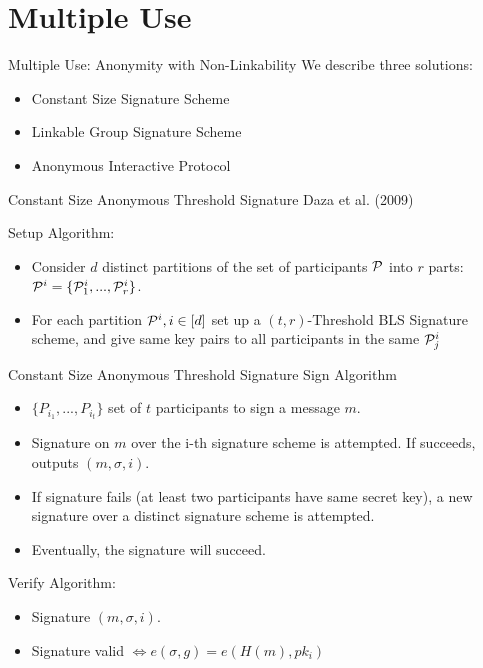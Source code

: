 \section{Multiple Use}
\begin{frame}{Multiple Use: Anonymity with Non-Linkability}
We describe three solutions:
\begin{itemize}
\item Constant Size Signature Scheme
\item Linkable Group Signature Scheme
\item Anonymous Interactive Protocol
\end{itemize}

\end{frame}

\begin{frame}{Constant Size Anonymous Threshold Signature}
Daza et al. (2009)

Setup Algorithm:
\begin{itemize}
\item Consider $d$ distinct partitions of the set of participants ${\mathcal P}$ into $r$ parts: ${\mathcal P}^i = \{{\mathcal P}_1^i, ... , {\mathcal P}_r^i\}$.
\item For each partition ${\mathcal P}^i, i \in [d]$ set up a $(t,r)$-Threshold BLS Signature scheme, and give same key pairs to all participants in the same ${\mathcal P}_j^i$
\end{itemize}

\end{frame}

\begin{frame}{Constant Size Anonymous Threshold Signature}
Sign Algorithm
\begin{itemize}
\item $\{ P_{i_1}, ... , P_{i_t}\}$ set of $t$ participants to sign a message $m$.
\item Signature on $m$ over the i-th signature scheme is attempted. If succeeds, outputs $(m,\sigma,i)$.
\item If signature fails (at least two participants have same secret key), a new signature over a distinct signature scheme is attempted.
\item Eventually, the signature will succeed.
\end{itemize}
Verify Algorithm:
\begin{itemize}
\item Signature $(m,\sigma,i)$.
\item Signature valid $\Leftrightarrow e(\sigma,g) = e(H(m),pk_i)$
\end{itemize}
\end{frame}

